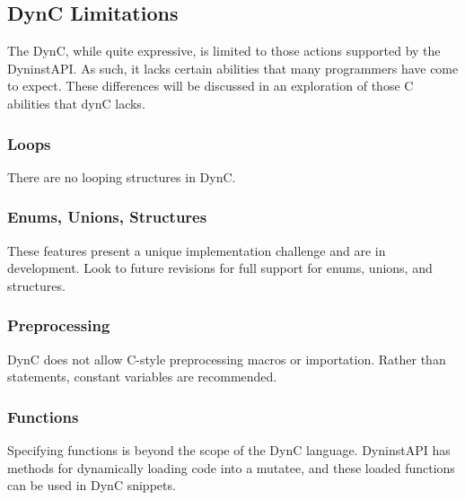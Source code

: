 \subsection{DynC Limitations}
The DynC, while quite expressive, is limited to those actions supported by the DyninstAPI. As such, it lacks certain abilities that many programmers have come to expect. These differences will be discussed in an exploration of those C abilities that dynC lacks.

\subsubsection{Loops}
There are no looping structures in DynC.

\subsubsection{Enums, Unions, Structures}
These features present a unique implementation challenge and are in development. Look to future revisions for full support for enums, unions, and structures.

\subsubsection{Preprocessing}
DynC does not allow C-style preprocessing macros or importation. Rather than
 statements, constant variables are recommended.

\subsubsection{Functions}
Specifying functions is beyond the scope of the DynC language. DyninstAPI has methods for dynamically loading code into a mutatee, and these loaded functions can be used in DynC snippets.


